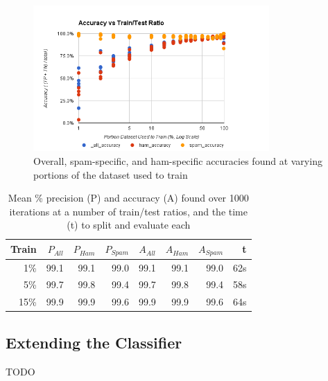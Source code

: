 \begin{figure}[ht!]
    \centering
    \includegraphics[width=90mm]{img/sms_basic-accuracy.png}
    \caption{Overall, spam-specific, and ham-specific accuracies found at varying portions of the dataset used to train}
    \label{fig:smsBasicAccuracy}
\end{figure}

\begin{table}
    \begin{tabular}{rrrrrrrr}
        \hline
        \textbf{Train} &
        \textbf{\begin{math}P_{All}\end{math}} & \textbf{\begin{math}P_{Ham}\end{math}} & \textbf{\begin{math}P_{Spam}\end{math}} &
        \textbf{\begin{math}A_{All}\end{math}} & \textbf{\begin{math}A_{Ham}\end{math}} & \textbf{\begin{math}A_{Spam}\end{math}} &
        \textbf{t} \\ [0.5ex]
        \hline\hline
        1\%  & 99.1 & 99.1 & 99.0 & 99.1 & 99.1 & 99.0 & 62s \\
        5\%  & 99.7 & 99.8 & 99.4 & 99.7 & 99.8 & 99.4 & 58s \\
        15\% & 99.9 & 99.9 & 99.6 & 99.9 & 99.9 & 99.6 & 64s \\
        \hline
    \end{tabular}
    \caption{Mean \% precision (P) and accuracy (A) found over 1000 iterations at a number of train/test ratios,
    and the time (t) to split and evaluate each}
    \label{table:smsBasicResults}
\end{table}


\subsection{Extending the Classifier}
\label{subsection:advancedResults}
TODO
